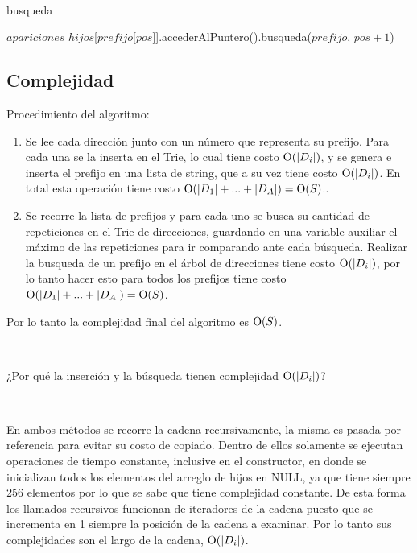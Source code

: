 ~

\begin{algorithm}[H]
	\caption{busqueda}

	 {
		\Return $apariciones$ \;
	} {
		 {
			 \;
		} {
			\Return $hijos$[$prefijo$[$pos$]].accederAlPuntero().busqueda($prefijo$, $pos + 1$) \;
		}
	}
\end{algorithm}

\subsection{Complejidad}

Procedimiento del algoritmo:

\begin{enumerate}
\item Se lee cada dirección junto con un número que representa su prefijo.
Para cada una se la inserta en el Trie, lo cual tiene costo $\operatorname{O}(|D_i|)$, y
se genera e inserta el prefijo en una lista de string, que a su vez tiene
costo $\operatorname{O}(|D_i|)$. En total esta operación tiene costo
$\operatorname{O}(|D_1| + ... + |D_A|) = \operatorname{O}(S)$..
\item Se recorre la lista de prefijos y para cada uno se busca su cantidad de
repeticiones en el Trie de direcciones, guardando en una variable auxiliar el
máximo de las repeticiones para ir comparando ante cada búsqueda. Realizar
la busqueda de un prefijo en el árbol de direcciones tiene costo
$\operatorname{O}(|D_i|)$, por lo tanto hacer esto para todos los prefijos tiene costo
$\operatorname{O}(|D_1| + ... + |D_A|) = \operatorname{O}(S)$.
\end{enumerate}

Por lo tanto la complejidad final del algoritmo es $\operatorname{O}(S)$.

~

¿Por qué la inserción y la búsqueda tienen complejidad $\operatorname{O}(|D_i|)$?

~

En ambos métodos se recorre la cadena recursivamente, la misma es pasada por
referencia para evitar su costo de copiado. Dentro de ellos solamente se
ejecutan operaciones de tiempo constante, inclusive en el constructor, en
donde se inicializan todos los elementos del arreglo de hijos en NULL, ya que
tiene siempre 256 elementos por lo que se sabe que tiene complejidad
constante. De esta forma los llamados recursivos funcionan de iteradores de la
cadena puesto que se incrementa en 1 siempre la posición de la cadena a
examinar. Por lo tanto sus complejidades son el largo de la cadena,
$\operatorname{O}(|D_i|)$.

